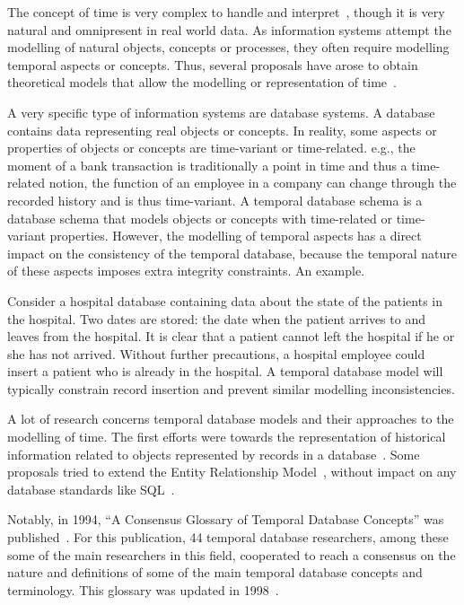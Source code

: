 %
%

The concept of time is very complex to handle and interpret~\cite{Klein1994,Shackle1961}, though it is very natural and omnipresent in real world data. As information systems attempt the modelling of natural objects, concepts or processes, they often require modelling temporal aspects or concepts. Thus, several proposals have arose to obtain theoretical models that allow the modelling or representation of time~\cite{Bolour1982,VanderCruyssen1997}.

A very specific type of information systems are database systems. A database contains data representing real objects or concepts. In reality, some aspects or properties of objects or concepts are time-variant or time-related. e.g., the moment of a bank transaction is traditionally a point in time and thus a time-related notion, the function of an employee in a company can change through the recorded history and is thus time-variant. A temporal database schema is a database schema that models objects or concepts with time-related or time-variant properties. However, the modelling of temporal aspects has a direct impact on the consistency of the temporal database, because the temporal nature of these aspects imposes extra integrity constraints. An example. 

Consider a hospital database containing data about the state of the patients in the hospital. Two dates are stored: the date when the patient arrives to and leaves from the hospital. It is clear that a patient cannot left the hospital if he or she has not arrived. Without further precautions, a hospital employee could insert a patient who is already in the hospital. A temporal database model will typically constrain record insertion and prevent similar modelling inconsistencies.

A lot of research concerns temporal database models and their approaches to the modelling of time. The first efforts were towards the representation of historical information related to objects represented by records in a database~\cite{Clifford1985}. Some proposals tried to extend the Entity Relationship Model~\cite{Klopprogge1983}, without impact on any database standards like SQL~\cite{Sarda1990}.

Notably, in 1994, ``A Consensus Glossary of Temporal Database Concepts'' was published~\cite{Dyreson1994}. For this publication, 44 temporal database researchers, among these some of the main researchers in this field, cooperated to reach a consensus on the nature and definitions of some of the main temporal database concepts and terminology. This glossary was updated in 1998~\cite{Dyreson1998}.


